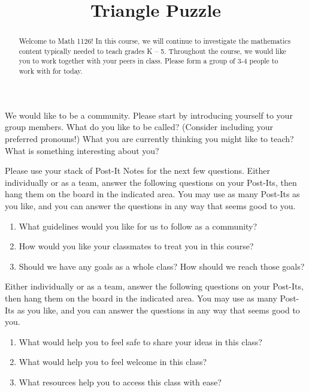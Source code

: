 \documentclass {ximera}
\title{Triangle Puzzle  }
\begin{document}
\begin{abstract} 
Welcome to Math 1126! In this course, we will continue to investigate the mathematics content typically needed to teach grades K -- 5. Throughout the course, we would like you to work together with your peers in class. Please form a group of 3-4 people to work with for today.
\end{abstract}
\maketitle



\begin{question}
We would like to be a community. Please start by introducing yourself to your group members. What do you like to be called? (Consider including your preferred pronouns!) What you are currently thinking you might like to teach? What is something interesting about you?
\end{question}


\begin{question}
Please use your stack of Post-It Notes for the next few questions. Either individually or as a team, answer the following questions on your Post-Its, then hang them on the board in the indicated area. You may use as many Post-Its as you like, and you can answer the questions in any way that seems good to you.
\begin{enumerate}
	\item What guidelines would you like for us to follow as a community?
	\item How would you like your classmates to treat you in this course?
	\item Should we have any goals as a whole class? How should we reach those goals?
\end{enumerate}
\end{question}

\begin{question}
Either individually or as a team, answer the following questions on your Post-Its, then hang them on the board in the indicated area. You may use as many Post-Its as you like, and you can answer the questions in any way that seems good to you.
\begin{enumerate}
	\item What would help you to feel safe to share your ideas in this class?
	\item What would help you to feel welcome in this class?
	\item What resources help you to access this class with ease?
\end{enumerate}

\end{question}
\end{document}
